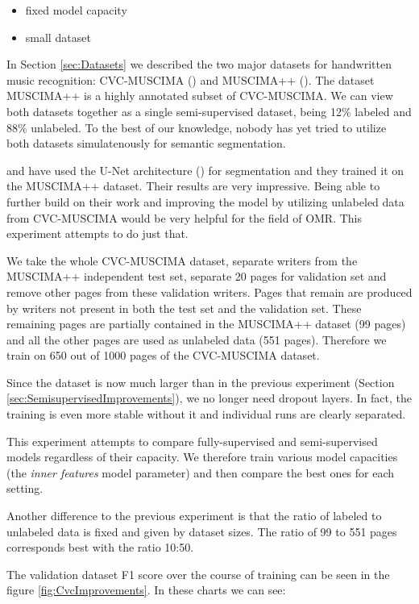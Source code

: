 \begin{itemize}
    \item fixed model capacity
    \item small dataset
\end{itemize}

In Section \ref{sec:Datasets} we described the two major datasets for handwritten music recognition: CVC-MUSCIMA (\cite{CvcMuscima}) and MUSCIMA++ (\cite{MuscimaPP}). The dataset MUSCIMA++ is a highly annotated subset of CVC-MUSCIMA. We can view both datasets together as a single semi-supervised dataset, being 12\% labeled and 88\% unlabeled. To the best of our knowledge, nobody has yet tried to utilize both datasets simulatenously for semantic segmentation.

\cite{DorferEtAl} and \cite{HajicEtAl} have used the U-Net architecture (\cite{UNet}) for segmentation and they trained it on the MUSCIMA++ dataset. Their results are very impressive. Being able to further build on their work and improving the model by utilizing unlabeled data from CVC-MUSCIMA would be very helpful for the field of OMR. This experiment attempts to do just that.

We take the whole CVC-MUSCIMA dataset, separate writers from the MUSCIMA++ independent test set, separate 20 pages for validation set and remove other pages from these validation writers. Pages that remain are produced by writers not present in both the test set and the validation set. These remaining pages are partially contained in the MUSCIMA++ dataset (99 pages) and all the other pages are used as unlabeled data (551 pages). Therefore we train on 650 out of 1000 pages of the CVC-MUSCIMA dataset.

Since the dataset is now much larger than in the previous experiment (Section \ref{sec:SemisupervisedImprovements}), we no longer need dropout layers. In fact, the training is even more stable without it and individual runs are clearly separated.

This experiment attempts to compare fully-supervised and semi-supervised models regardless of their capacity. We therefore train various model capacities (the \emph{inner features} model parameter) and then compare the best ones for each setting.

Another difference to the previous experiment is that the ratio of labeled to unlabeled data is fixed and given by dataset sizes. The ratio of 99 to 551 pages corresponds best with the ratio 10:50.

The validation dataset F1 score over the course of training can be seen in the figure \ref{fig:CvcImprovements}. In these charts we can see:

